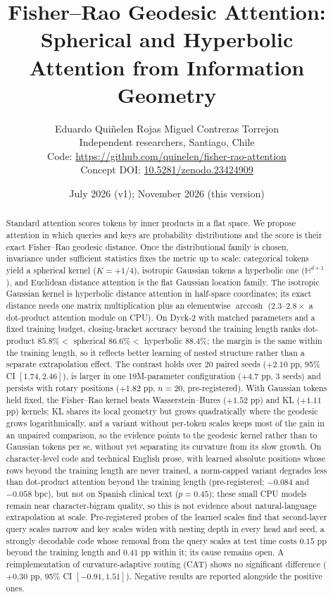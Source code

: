 \documentclass[11pt]{article}
\title{Fisher--Rao Geodesic Attention: Spherical and Hyperbolic Attention from Information Geometry}
\author{Eduardo Qui\~nelen Rojas \qquad Miguel Contreras Torrejon\\[4pt]
\small Independent researchers, Santiago, Chile\\
\small Code: \url{https://github.com/quinelen/fisher-rao-attention}\\
\small Concept DOI: \href{https://doi.org/10.5281/zenodo.23424909}{10.5281/zenodo.23424909}}
\date{July 2026 (v1); November 2026 (this version)}
\DeclareMathOperator{\arccosh}{arccosh}
\begin{document}
\maketitle

\begin{abstract}
Standard attention scores tokens by inner products in a flat space. We propose attention in which queries and keys are probability distributions and the score is their exact Fisher--Rao geodesic distance. Once the distributional family is chosen, invariance under sufficient statistics fixes the metric up to scale: categorical tokens yield a spherical kernel ($K=+1/4$), isotropic Gaussian tokens a hyperbolic one ($\mathbb{H}^{d+1}$), and Euclidean distance attention is the flat Gaussian location family. The isotropic Gaussian kernel is hyperbolic distance attention in half-space coordinates; its exact distance needs one matrix multiplication plus an elementwise $\arccosh$ ($2.3$--$2.8\times$ a dot-product attention module on CPU). On Dyck-2 with matched parameters and a fixed training budget, closing-bracket accuracy beyond the training length ranks dot-product $85.8\% <$ spherical $86.6\% <$ hyperbolic $88.4\%$; the margin is the same within the training length, so it reflects better learning of nested structure rather than a separate extrapolation effect. The contrast holds over 20 paired seeds ($+2.10$ pp, 95\% CI $[1.74, 2.46]$), is larger in one 19M-parameter configuration ($+4.7$ pp, 3 seeds) and persists with rotary positions ($+1.82$ pp, $n{=}20$, pre-registered). With Gaussian tokens held fixed, the Fisher--Rao kernel beats Wasserstein--Bures ($+1.52$ pp) and KL ($+1.11$ pp) kernels; KL shares its local geometry but grows quadratically where the geodesic grows logarithmically, and a variant without per-token scales keeps most of the gain in an unpaired comparison, so the evidence points to the geodesic kernel rather than to Gaussian tokens per se, without yet separating its curvature from its slow growth. On character-level code and technical English prose, with learned absolute positions whose rows beyond the training length are never trained, a norm-capped variant degrades less than dot-product attention beyond the training length (pre-registered; $-0.084$ and $-0.058$ bpc), but not on Spanish clinical text ($p = 0.45$); these small CPU models remain near character-bigram quality, so this is not evidence about natural-language extrapolation at scale. Pre-registered probes of the learned scales find that second-layer query scales narrow and key scales widen with nesting depth in every head and seed, a strongly decodable code whose removal from the query scales at test time costs $0.15$ pp beyond the training length and $0.41$ pp within it; its cause remains open. A reimplementation of curvature-adaptive routing (CAT) shows no significant difference ($+0.30$ pp, 95\% CI $[-0.91, 1.51]$). Negative results are reported alongside the positive ones.
\end{abstract}
\end{document}

